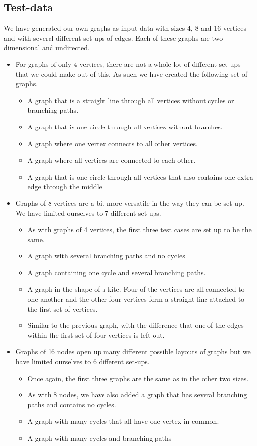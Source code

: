 \documentclass[a4paper,12pt,twoside]{article}
\begin{document}
\subsection{Test-data}
We have generated our own graphs as input-data with sizes 4, 8 and 16 vertices and with several different set-ups of edges. Each of these graphs are two-dimensional and undirected.
\begin{itemize}
\item For graphs of only 4 vertices, there are not a whole lot of different set-ups that we could make out of this. As such we have created the following set of graphs.
\begin{itemize}
\item A graph that is a straight line through all vertices without cycles or branching paths.
\item A graph that is one circle through all vertices without branches.
\item A graph where one vertex connects to all other vertices.
\item A graph where all vertices are connected to each-other.
\item A graph that is one circle through all vertices that also contains one extra edge through the middle.
\end{itemize}
\item Graphs of 8 vertices are a bit more versatile in the way they can be set-up. We have limited ourselves to 7 different set-ups.
\begin{itemize}
\item As with graphs of 4 vertices, the first three test cases are set up to be the same.
\item A graph with several branching paths and no cycles
\item A graph containing one cycle and several branching paths.
\item A graph in the shape of a kite. Four of the vertices are all connected to one another and the other four vertices form a straight line attached to the first set of vertices.
\item Similar to the previous graph, with the difference that one of the edges within the first set of four vertices is left out.
\end{itemize}
\item Graphs of 16 nodes open up many different possible layouts of graphs but we have limited ourselves to 6 different set-ups.
\begin{itemize}
\item Once again, the first three graphs are the same as in the other two sizes.
\item As with 8 nodes, we have also added a graph that has several branching paths and contains no cycles.
\item A graph with many cycles that all have one vertex in common.
\item A graph with many cycles and branching paths
\end{itemize}
\end{itemize}
\end{document}
